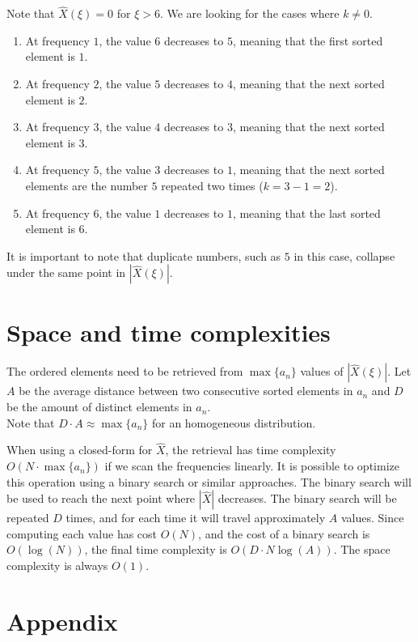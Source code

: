 \documentclass{article}
\begin{document}
Note that \(\hat{X}(\xi) = 0\) for \(\xi > 6\).
We are looking for the cases where \(k \neq 0\). \\
\begin{enumerate}
    \item At frequency \(1\), the value \(6\) decreases to \(5\), meaning that the first sorted element is \(1\).
    \item At frequency \(2\), the value \(5\) decreases to \(4\), meaning that the next sorted element is \(2\).
    \item At frequency \(3\), the value \(4\) decreases to \(3\), meaning that the next sorted element is \(3\).
    \item At frequency \(5\), the value \(3\) decreases to \(1\), meaning that the next sorted elements are the number \(5\)
    repeated two times (\(k=3-1=2\)).
    \item At frequency \(6\), the value \(1\) decreases to \(1\), meaning that the last sorted element is \(6\).
\end{enumerate}

It is important to note that duplicate numbers,
such as \(5\) in this case, collapse under the same
point in \(|\hat{X}(\xi)|\).

\section{Space and time complexities}

The ordered elements need to be retrieved from \(\max\{a_n\}\) values of
\(|\hat{X}(\xi)|\). Let \(A\) be the average distance between two consecutive sorted
elements in \(a_n\) and \(D\) be the amount of distinct elements in \(a_n\).\\
Note that \(D \cdot A \approx \max\{a_n\}\) for an homogeneous distribution.

When using a closed-form for \(\hat{X}\), the retrieval has time complexity
\(O(N \cdot \max\{a_n\})\) if we scan the frequencies linearly.
It is possible to optimize this operation using a binary search or similar approaches.
The binary search will be used to reach the next point where \(|\hat{X}|\) decreases.
The binary search will be repeated \(D\) times, and for each time
it will travel approximately \(A\) values. Since computing each value has cost \(O(N)\),
and the cost of a binary search is \(O(\log(N))\),
the final time complexity is \(O(D \cdot N \log(A))\).
The space complexity is always \(O(1)\).

\section{Appendix}
\end{document}
